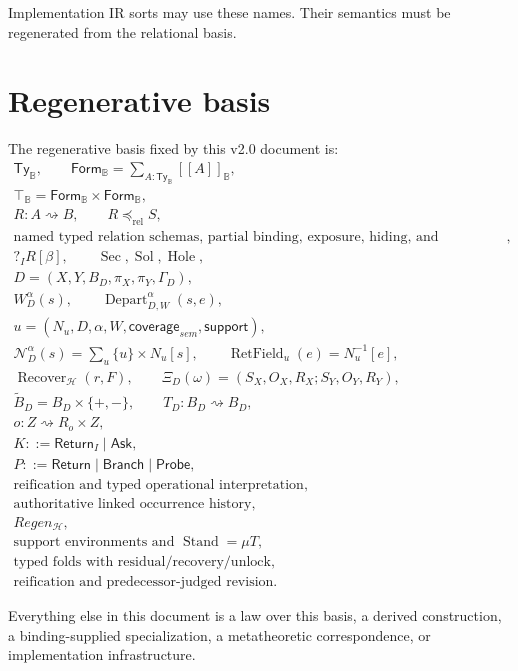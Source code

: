 \documentclass[11pt,oneside]{article}
\newcommand{\B}{\mathbb B}
\newcommand{\Depart}{\operatorname{Depart}}
\newcommand{\RetField}{\operatorname{RetField}}
\newcommand{\Stand}{\operatorname{Stand}}
\newcommand{\Recover}{\operatorname{Recover}}
\newcommand{\den}[1]{[\![#1]\!]}
\begin{document}
Implementation IR sorts may use these names.  Their semantics must be regenerated from the relational basis.

\section{Regenerative basis}

The regenerative basis fixed by this v2.0 document is:
\[
\boxed{
\begin{gathered}
\mathsf{Ty}_{\B},
\qquad
\mathsf{Form}_{\B}=\sum_{A:\mathsf{Ty}_{\B}}\den A_{\B},\\
\top_{\B}=\mathsf{Form}_{\B}\times\mathsf{Form}_{\B},\\
R:A\rightsquigarrow B,
\qquad
R\preceq_{\mathrm{rel}}S,\\
\text{named typed relation schemas, partial binding, exposure, hiding, and composition},\\
?_IR[\beta],
\qquad
\operatorname{Sec},\operatorname{Sol},\operatorname{Hole},\\
D=(X,Y,B_D,\pi_X,\pi_Y,\Gamma_D),\\
W_D^\alpha(s),
\qquad
\Depart_{D,W}^{\alpha}(s,e),\\
u=(N_u,D,\alpha,W,\mathsf{coverage}_{sem},\mathsf{support}),\\
\mathcal N_D^\alpha(s)=\sum_u\{u\}\times N_u[s],
\qquad
\RetField_u(e)=N_u^{-1}[e],\\
\Recover_{\mathcal H}(r,F),
\qquad
\Xi_D(\omega)=(S_X,O_X,R_X;S_Y,O_Y,R_Y),\\
\widetilde B_D=B_D\times\{+,-\},
\qquad
T_D:B_D\rightsquigarrow B_D,\\
o:Z\rightsquigarrow R_o\times Z,\\
K::=\mathsf{Return}_I\mid\mathsf{Ask},\\
P::=\mathsf{Return}\mid\mathsf{Branch}\mid\mathsf{Probe},\\
\text{reification and typed operational interpretation},\\
\text{authoritative linked occurrence history},\\
Regen_{\mathcal H},\\
\text{support environments and }\Stand=\mu T,\\
\text{typed folds with residual/recovery/unlock},\\
\text{reification and predecessor-judged revision}.
\end{gathered}
}
\]

Everything else in this document is a law over this basis, a derived construction, a binding-supplied specialization, a metatheoretic correspondence, or implementation infrastructure.
\end{document}

